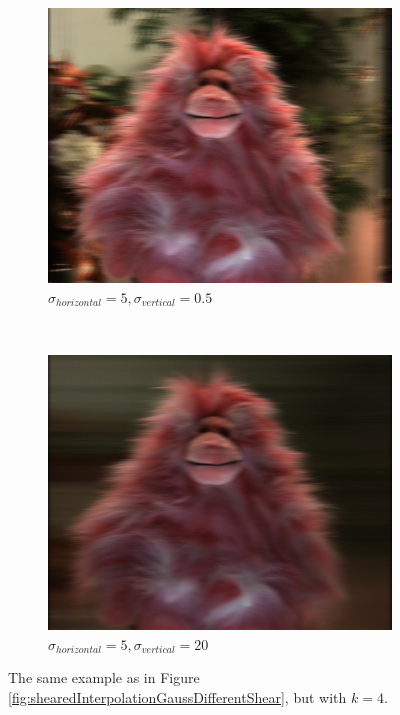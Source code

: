 \documentclass[a4paper]{article}
\begin{document}
\begin{figure}[ht]
	\vspace{2mm}
	\begin{subfigure}[h]{0.48\textwidth}
	  \includegraphics[width=\textwidth]{shearedGauss_k1_shear16_sighor5_sigvert0-5}
	  \caption*{$\sigma_{horizontal} = 5, \sigma_{vertical} = 0.5$}
	\end{subfigure}
    	~
	\begin{subfigure}[h]{0.48\textwidth}
	  \includegraphics[width=\textwidth]{shearedGauss_k1_shear16_sighor5_sigvert20}
	  \caption*{$\sigma_{horizontal} = 5, \sigma_{vertical} = 20$}
	\end{subfigure}
\caption{The same example as in Figure \ref{fig:shearedInterpolationGaussDifferentShear}, but with $k=4$.}
\label{fig:shearedInterpolationGaussDifferentFilterSize3}
\end{figure}
\end{document}
